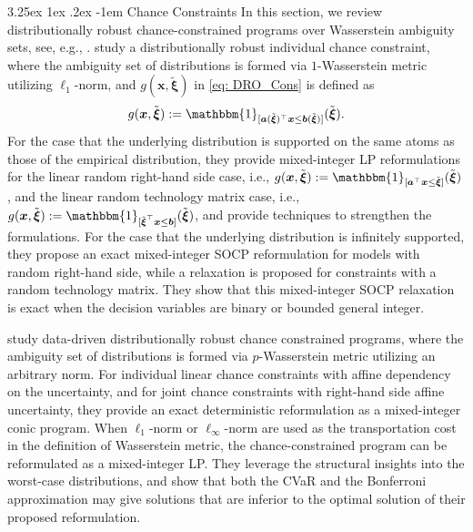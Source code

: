 \documentclass[final,onefignum,onetabnum]{class}
\makeatletter
\renewcommand\paragraph{\@startsection{paragraph}{4}{\z@}%
  {3.25ex \@plus1ex \@minus.2ex}%
  {-1em}%
  {\normalfont\normalsize\bfseries}}
\newcommand{\bs}[1]{\boldsymbol{#1}} %
\newcommand{\txi}{\tilde{\bs{\xi}}}
\makeatother
\begin{document}
\paragraph{Chance Constraints}
In this section, we review distributionally robust chance-constrained programs over Wasserstein ambiguity sets, see, e.g., \citet{jiang2016chance,chen2018chance,xie2018wass,yang2018control}. \citet{ji2018chance}  study a distributionally robust individual chance constraint, where the ambiguity set of distributions is formed via $1$-Wasserstein metric utilizing  $\ell_{1}$-norm, and $g(\bs{x}, \txi)$ in \eqref{eq: DRO_Cons} is defined as 
$$g(\bs{x}, \txi):=\mathbbm{1}_{[\bs{a}(\txi)^{\top}\bs{x} \le \bs{b}(\txi)]}(\txi).$$ 
For the case that the underlying distribution is supported on the same atoms as those of the empirical distribution, they provide mixed-integer LP reformulations for the linear random right-hand side case, i.e., $g(\bs{x}, \txi):=\mathbbm{1}_{[\bs{a}^{\top}\bs{x} \le \txi]}(\txi)$, and the linear random technology matrix case, i.e., $g(\bs{x}, \txi):=\mathbbm{1}_{[\txi^{\top}\bs{x} \le \bs{b}]}(\txi)$, and provide techniques to strengthen the formulations. 
For the case that the underlying distribution is infinitely supported, they propose an exact mixed-integer SOCP reformulation for models with random right-hand side, while a relaxation is proposed for constraints with a random
technology matrix. They show that this mixed-integer SOCP relaxation is exact when the decision variables are binary or bounded general integer.

\citet{chen2018chance} study data-driven distributionally robust chance constrained programs, where the ambiguity set of distributions is formed via $p$-Wasserstein metric utilizing an arbitrary norm. For individual linear chance constraints with affine dependency on the uncertainty, and for joint  chance constraints with right-hand side affine uncertainty, they provide an exact deterministic reformulation as a mixed-integer conic program. When $\ell_{1}$-norm or $\ell_{\infty}$-norm are used as the transportation cost in the  definition of Wasserstein metric, the chance-constrained program can be reformulated as a mixed-integer LP. They leverage the structural insights into the worst-case distributions, and  show that both the CVaR and the Bonferroni approximation may give solutions that are inferior to the optimal solution of their proposed reformulation. %
\end{document}
